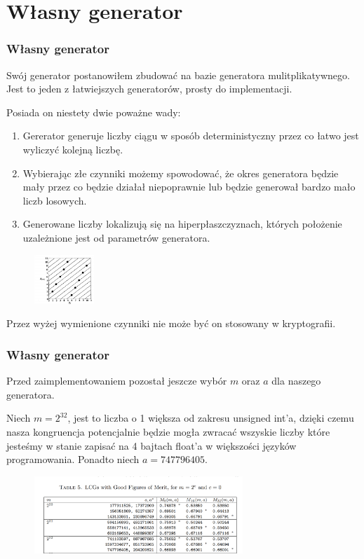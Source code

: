 \documentclass[9pt]{beamer}
\begin{document}
\section{Własny generator}
\begin{frame}
  \frametitle{Własny generator}
    Swój generator postanowiłem zbudować na bazie generatora mulitplikatywnego. Jest to jeden z łatwiejszych generatorów, prosty do implementacji. 
    
    Posiada on niestety dwie poważne wady:
    \begin{enumerate}
      \item Gererator generuje liczby ciągu w sposób deterministyczny przez co łatwo jest wyliczyć kolejną liczbę.
      \item Wybierając złe czynniki możemy spowodować, że okres generatora będzie mały przez co będzie działał niepoprawnie lub będzie generował bardzo mało liczb losowych.
      \item Generowane liczby lokalizują się na hiperpłaszczyznach, których położenie uzależnione jest od parametrów generatora.
    \end{enumerate} 
    \begin{figure}[h]
      \begin{center}
      \includegraphics[width=0.2\textwidth]{assets/1.PNG}
      \end{center}
      \end{figure}
    Przez wyżej wymienione czynniki nie może być on stosowany w kryptografii.
\end{frame}
\begin{frame}
  \frametitle{Własny generator}
  Przed zaimplementowaniem pozostał jeszcze wybór $m$ oraz $a$ dla naszego generatora.

  Niech $m=2^{32}$, jest to liczba o 1 większa od zakresu unsigned int'a, dzięki czemu nasza kongruencja potencjalnie będzie mogła zwracać wszyskie liczby które jesteśmy w stanie zapisać na 4 bajtach float'a w większości języków programowania. Ponadto niech $a=747796405.$
  \begin{figure}[h]
    \begin{center}
    \includegraphics[width=0.7\textwidth]{assets/table.PNG}
    \end{center}
    \end{figure}
\end{frame}
\end{document}
